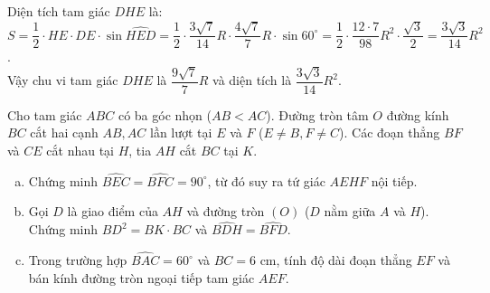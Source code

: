 \begin{bt}
{\begin{enumerate}[a)]
	Diện tích tam giác $DHE$ là:
	$S = \dfrac{1}{2} \cdot HE \cdot DE \cdot \sin\widehat{HED} = \dfrac{1}{2} \cdot \dfrac{3\sqrt{7}}{14}R \cdot \dfrac{4\sqrt{7}}{7}R \cdot \sin 60^\circ = \dfrac{1}{2} \cdot \dfrac{12\cdot 7}{98}R^2 \cdot \dfrac{\sqrt{3}}{2} = \dfrac{3\sqrt{3}}{14}R^2$.\\
	Vậy chu vi tam giác $DHE$ là $\dfrac{9\sqrt{7}}{7}R$ và diện tích là $\dfrac{3\sqrt{3}}{14}R^2$.
\end{enumerate}
}
\end{bt}

\begin{bt}%
Cho tam giác $ABC$ có ba góc nhọn ($AB < AC$). Đường tròn tâm $O$ đường kính $BC$ cắt hai cạnh $AB, AC$ lần lượt tại $E$ và $F$ ($E \neq B, F \neq C$). Các đoạn thẳng $BF$ và $CE$ cắt nhau tại $H$, tia $AH$ cắt $BC$ tại $K$.
\begin{enumerate}[a)]
	\item Chứng minh $\widehat{BEC} = \widehat{BFC} = 90^\circ$, từ đó suy ra tứ giác $AEHF$ nội tiếp.
	\item Gọi $D$ là giao điểm của $AH$ và đường tròn $(O)$ ($D$ nằm giữa $A$ và $H$). Chứng minh $BD^2 = BK \cdot BC$ và $\widehat{BDH} = \widehat{BFD}$.
	\item Trong trường hợp $\widehat{BAC} = 60^\circ$ và $BC = 6\text{ cm}$, tính độ dài đoạn thẳng $EF$ và bán kính đường tròn ngoại tiếp tam giác $AEF$.
\end{enumerate}
\end{bt}
